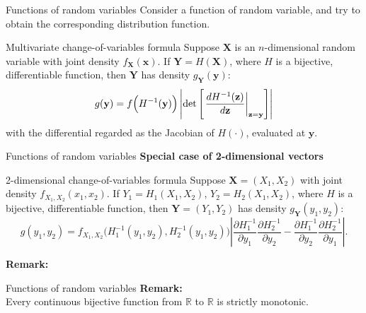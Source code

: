 \documentclass [aspectratio=169]{beamer}
\begin{document}
\begin{frame}{Functions of random variables}
Consider a function of random variable, and try to obtain the corresponding distribution function.
    \begin{block}{Multivariate change-of-variables formula}
    Suppose $\mathbf{X}$ is an $n$-dimensional random variable with joint density $f_{\mathbf{X}}(\mathbf{x})$. If $\mathbf{Y} = H(\mathbf{X})$, where $H$ is a bijective, differentiable function, then $\mathbf{Y}$ has density $g_\mathbf{Y}(\mathbf{y})$:
    $$
    {\displaystyle g(\mathbf {y} )=f{\Bigl (}H^{-1}(\mathbf {y} ){\Bigr )}\left|\det \left[\left.{\frac {dH^{-1}(\mathbf {z} )}{d\mathbf {z} }}\right|_{\mathbf {z} =\mathbf {y} }\right]\right|}
    $$
with the differential regarded as the Jacobian of $H(\cdot)$, evaluated at $\mathbf{y}$.
\end{block}
\vspace{0.1in}
\end{frame}

\begin{frame}{Functions of random variables}
\textbf{Special case of 2-dimensional vectors}
    \begin{block}{2-dimensional change-of-variables formula}
    Suppose $\mathbf{X} = (X_1, X_2)$ with joint density $f_{X_1, X_2}(x_1, x_2)$. If $Y_1 = H_1(X_1, X_2)$, $Y_2 = H_2(X_1, X_2)$, where $H$ is a bijective, differentiable function, then $\mathbf{Y} = (Y_1, Y_2)$ has density $g_\mathbf{Y}(y_1, y_2)$:
    $$
    {\displaystyle g(y_{1},y_{2})=f_{X_{1},X_{2}}{\big (}H_{1}^{-1}(y_{1},y_{2}),H_{2}^{-1}(y_{1},y_{2}){\big )}\left\vert {\frac {\partial H_{1}^{-1}}{\partial y_{1}}}{\frac {\partial H_{2}^{-1}}{\partial y_{2}}}-{\frac {\partial H_{1}^{-1}}{\partial y_{2}}}{\frac {\partial H_{2}^{-1}}{\partial y_{1}}}\right\vert .}
    $$
\end{block}
\vspace{0.1in}
\textbf{Remark:}\\
\vspace{0.1in}
\end{frame}

\begin{frame}{Functions of random variables}
\textbf{Remark:}\\
Every continuous bijective function from $\mathbb{R}$ to $\mathbb{R}$ is strictly monotonic. \\
\vspace{0.1in}
\end{frame}
\end{document}
